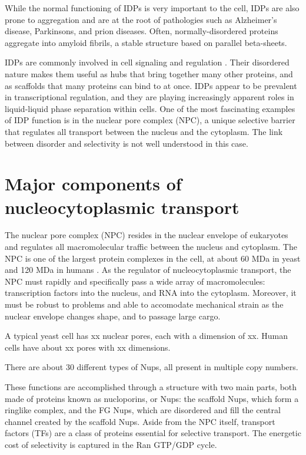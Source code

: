 While the normal functioning of IDPs is very important to the cell, IDPs are also prone to aggregation and are at the root of pathologies such as Alzheimer's disease, Parkinsons, and prion diseases.  Often, normally-disordered proteins aggregate into amyloid fibrils, a stable structure based on parallel beta-sheets.

IDPs are commonly involved in cell signaling and regulation \cite{uversky13}.  Their disordered nature makes them useful as hubs that bring together many other proteins, and as scaffolds that many proteins can bind to at once.  IDPs appear to be prevalent in transcriptional regulation, and they are playing increasingly apparent roles in liquid-liquid phase separation within cells.  One of the most fascinating examples of IDP function is in the nuclear pore complex (NPC), a unique selective barrier that regulates all transport between the nucleus and the cytoplasm.  The link between disorder and selectivity is not well understood in this case.


\section{Major components of nucleocytoplasmic transport}
The nuclear pore complex (NPC) resides in the nuclear envelope of eukaryotes and regulates all macromolecular traffic between the nucleus and cytoplasm.  The NPC is one of the largest protein complexes in the cell, at about 60 MDa in yeast and 120 MDa in humans \cite{beck17}.  As the regulator of nucleocytoplasmic transport, the NPC must rapidly and specifically pass a wide array of macromolecules: transcription factors into the nucleus, and RNA into the cytoplasm.  Moreover, it must be robust to problems and able to accomodate mechanical strain as the nuclear envelope changes shape, and to passage large cargo.

A typical yeast cell has xx nuclear pores, each with a dimension of xx.  Human cells have about xx pores with xx dimensions.

There are about 30 different types of Nups, all present in multiple copy numbers.

These functions are accomplished through a structure with two main parts, both made of proteins known as nucloporins, or Nups: the scaffold Nups, which form a ringlike complex, and the FG Nups, which are disordered and fill the central channel created by the scaffold Nups.  Aside from the NPC itself, transport factors (TFs) are a class of proteins essential for selective transport.  The energetic cost of selectivity is captured in the Ran GTP/GDP cycle.

